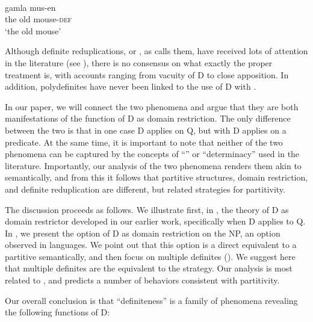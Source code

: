 \documentclass[output=paper,
modfonts
]{langscibook}
\begin{document}
\ea\label{ex:etxeberria:14}
	 \\
	 {gamla} {mus-en}\\ 
	the old mouse-\textsc{def}\\
	\glt `the old mouse'
\z

Although  definite reduplications, or , as \citet{kolliakou2004} calls them, have received lots of attention in the literature (see \citealt{AlexiadouWilder1998b, CamposStravrou2004, kolliakou2004, ioannidou-dendikken2006, lekakou-szendroi2007}), there is no consensus on what exactly the proper treatment is, with accounts ranging from vacuity of D to close apposition. In addition, polydefinites have never been linked to the use of D with . 

In our paper, we will connect the two phenomena and argue that they are both manifestations of the function of D as domain restriction. The only difference between the two is that in one case D applies on Q, but with  D applies on a predicate. At the same time, it is important to note that neither of the two phenomena can be captured by the concepts of ``'' or ``determinacy'' \citep{CoppockBeaver2015} used in the literature. Importantly, our analysis of the two phenomena renders them akin to  semantically, and from this it follows that partitive structures, domain restriction, and definite reduplication are different, but related strategies for partitivity. 

The discussion proceeds as follows. We illustrate first, in , the theory of D as domain restrictor developed in our earlier work, specifically when D applies to Q. In , we present the option of D as domain restriction on the NP, an option observed in  languages. We point out that this option is a direct equivalent to a partitive semantically, and then focus on multiple definites (). We suggest here that multiple definites are the  equivalent to the  strategy. Our analysis is most related to \citet{kolliakou2004}, and predicts a number of behaviors consistent with partitivity.

Our overall conclusion is that ``definiteness'' is a family of phenomena revealing the following functions of D: \newpage 
\end{document}

